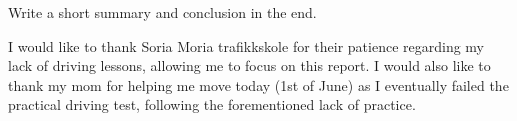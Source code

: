 \documentclass{aa}
\begin{document}
Write a short summary and conclusion in the end. 

\begin{acknowledgements}
      I would like to thank Soria Moria trafikkskole for their patience regarding my lack of driving lessons, allowing me to focus on this report. I would also like to thank my mom for helping me move today (1st of June) as I eventually failed the practical driving test, following the forementioned lack of practice.     
\end{acknowledgements}


\clearpage
% 

% 

% 
\end{document}
